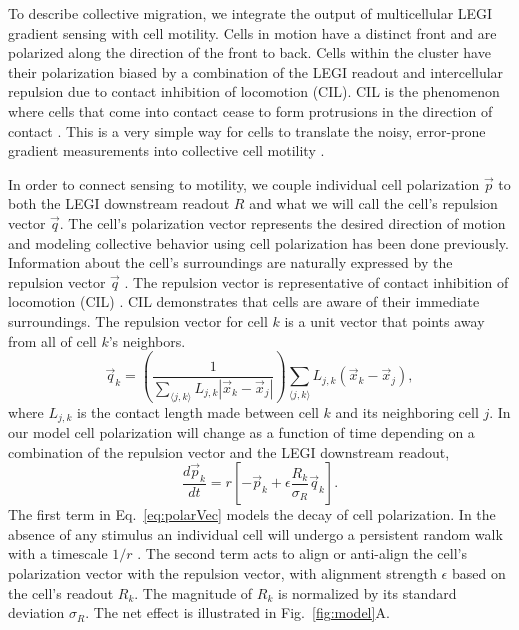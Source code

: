 To describe collective migration, we integrate the output of multicellular LEGI gradient sensing with cell motility. Cells in motion have a distinct front and are polarized along the direction of the front to back. Cells within the cluster have their polarization biased by a combination of the LEGI readout and intercellular repulsion due to contact inhibition of locomotion (CIL). CIL is the phenomenon where cells that come into contact cease to form protrusions in the direction of contact \cite{mayor2010keeping}. This is a very simple way for cells to translate the noisy, error-prone gradient measurements into collective cell motility \cite{camley2016emergent,malet2015collective,theveneau2010collective}.

In order to connect sensing to motility, we couple individual cell polarization $\vec{p}$ to both the LEGI downstream readout $R$ and what we will call the cell's repulsion vector $\vec{q}$. The cell's polarization vector represents the desired direction of motion \cite{jilkine2011comparison} and modeling collective behavior using cell polarization has been done previously\cite{szabo2010collective,camley2016emergent}. Information about the cell's surroundings are naturally expressed by the repulsion vector $\vec{q}$ \cite{camley2016emergent}. The repulsion vector is representative of contact inhibition of locomotion (CIL) \cite{mayor2010keeping}. CIL demonstrates that cells are aware of their immediate surroundings. The repulsion vector for cell $k$ is a unit vector that points away from all of cell $k$'s neighbors.
\begin{equation}
    \vec{q}_k = \left( \frac{1}{\sum_{\langle j,k \rangle} L_{j,k}|\vec{x}_k - \vec{x}_j|} \right)
    \sum_{\langle j,k \rangle} L_{j,k} \left( \vec{x}_k - \vec{x}_j \right),
\end{equation}
where $L_{j,k}$ is the contact length made between cell $k$ and its neighboring cell $j$. In our model cell polarization will change as a function of time depending on a combination of the repulsion vector and the LEGI downstream readout,
\begin{equation} \label{eq:polarVec}
    \frac{d\vec{p}_k}{dt} = r \left[ -\vec{p}_k + \epsilon \frac{R_k}{\sigma_R} \vec{q}_k \right].
\end{equation}
The first term in Eq.\ \ref{eq:polarVec} models the decay of cell polarization. In the absence of any stimulus an individual cell will undergo a persistent random walk with a timescale $1/r$ \cite{szabo2010collective}. The second term acts to align or anti-align the cell’s polarization vector with the repulsion vector, with alignment strength $\epsilon$ based on the cell's readout $R_k$. The magnitude of $R_k$ is normalized by its standard deviation $\sigma_R$. The net effect is illustrated in Fig.\ \ref{fig:model}A.

